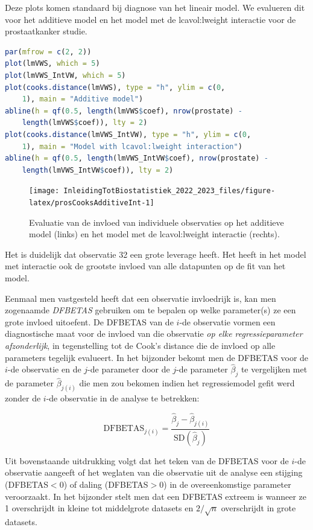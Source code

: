 \documentclass[
  12pt,dutch,coursenotes]{book}
\begin{document}
Deze plots komen standaard bij diagnose van het lineair model.
We evalueren dit voor het additieve model en het model met de lcavol:lweight interactie voor de prostaatkanker studie.

\begin{lstlisting}[language=R]
par(mfrow = c(2, 2))
plot(lmVWS, which = 5)
plot(lmVWS_IntVW, which = 5)
plot(cooks.distance(lmVWS), type = "h", ylim = c(0,
    1), main = "Additive model")
abline(h = qf(0.5, length(lmVWS$coef), nrow(prostate) -
    length(lmVWS$coef)), lty = 2)
plot(cooks.distance(lmVWS_IntVW), type = "h", ylim = c(0,
    1), main = "Model with lcavol:lweight interaction")
abline(h = qf(0.5, length(lmVWS_IntVW$coef), nrow(prostate) -
    length(lmVWS_IntVW$coef)), lty = 2)
\end{lstlisting}

\begin{figure}

{\centering \texttt{[image: InleidingTotBiostatistiek\_2022\_2023\_files/figure-latex/prosCooksAdditiveInt-1]} 

}

\caption{Evaluatie van de invloed van individuele observaties op het additieve model (links) en het model met de lcavol:lweight interactie (rechts).}\label{fig:prosCooksAdditiveInt}
\end{figure}

Het is duidelijk dat observatie 32 een grote leverage heeft. Het heeft in het model met interactie ook de grootste invloed van alle datapunten op de fit van het model.

Eenmaal men vastgesteld heeft dat een observatie invloedrijk is, kan men zogenaamde \emph{DFBETAS} gebruiken om te bepalen op welke parameter(s) ze een grote invloed uitoefent. De DFBETAS van de \(i\)-de observatie vormen een diagnostische maat voor de invloed van die observatie \emph{op elke regressieparameter afzonderlijk}, in tegenstelling tot de Cook's distance die de invloed op alle parameters tegelijk evalueert. In het bijzonder bekomt men de DFBETAS voor de \(i\)-de observatie en de \(j\)-de parameter door de \(j\)-de parameter \(\hat{\beta}_j\) te vergelijken met de parameter \(\hat{\beta}_{j(i)}\) die men zou bekomen indien het regressiemodel gefit werd zonder de \(i\)-de observatie in de analyse te betrekken:

\[\textrm{DFBETAS}_{j(i)}=\frac{\hat{\beta}_{j}-\hat{\beta}_{j(i)}}{\textrm{SD}(\hat{\beta}_{j})}\]

Uit bovenstaande uitdrukking volgt dat het teken van de DFBETAS voor de \(i\)-de observatie aangeeft of het weglaten van die observatie uit de analyse een stijging (DFBETAS\(<0\)) of daling (DFBETAS\(>0\)) in de overeenkomstige parameter veroorzaakt. In het bijzonder stelt men dat een DFBETAS extreem is wanneer ze 1 overschrijdt in kleine tot middelgrote datasets en \(2/\sqrt{n}\) overschrijdt in grote datasets.
\end{document}
